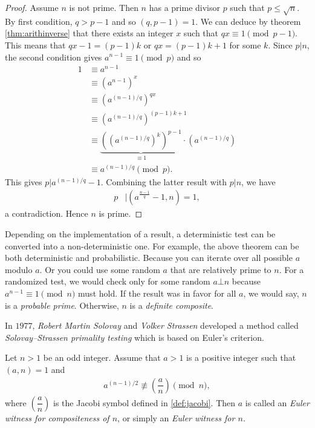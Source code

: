 \documentclass{subfiles}
\begin{document}
		\begin{proof}
			Assume $n$ is not prime. Then $n$ has a prime divisor $p$ such that $p \leq \sqrt n$. By first condition, $q>p-1$ and so $(q, p-1)=1$. We can deduce by theorem \autoref{thm:arithinverse} that there exists an integer $x$ such that $qx \equiv 1 \pmod {p-1}$. This means that $qx-1 = (p-1)k$ or $qx = (p-1)k+1$ for some $k$. Since $p|n$, the second condition gives $a^{n-1} \equiv 1 \pmod p$ and so
				\begin{align*}
					1 & \equiv a^{n-1} \\
					  & \equiv \left(a^{n-1}\right)^{x}\\
					  & \equiv \left(a^{(n-1)/q}\right)^{qx}\\
					  & \equiv \left(a^{(n-1)/q}\right)^{(p-1)k+1}\\
					  & \equiv \underbrace{\left(\left(a^{(n-1)/q}\right)^{k}\right)^{p-1}}_{\equiv 1} \cdot \left(a^{(n-1)/q}\right)\\
					  & \equiv a^{(n-1)/q} \pmod p.
				\end{align*}
			This gives $p|a^{(n-1)/q}-1$. Combining the latter result with $p|n$, we have
				\begin{align*}
					p & \mid \left(a^{\frac{n-1}{q}}-1,n\right)=1,
				\end{align*}
			a contradiction. Hence $n$ is prime.
		\end{proof}

		\begin{note}
			Depending on the implementation of a result, a deterministic test can be converted into a non-deterministic one. For example, the above theorem can be both deterministic and probabilistic. Because you can iterate over all possible $a$ modulo $a$. Or you could use some random $a$ that are relatively prime to $n$. For a randomized test, we would check only for some random $a\bot n$ because $a^{n-1}\equiv1\pmod n$ must hold. If the result was in favor for all $a$, we would say, $n$ is a \textit{probable prime}. Otherwise, $n$ is a \textit{definite composite}.
		\end{note}
	In $1977$, \textit{Robert Martin Solovay} and \textit{Volker Strassen} developed a method called \textit{Solovay--Strassen primality testing} which is based on Euler's criterion.

		\begin{definition}
			Let $n>1$ be an odd integer. Assume that $a>1$ is a positive integer such that $(a,n)=1$ and
				\begin{align*}
					a^{(n-1)/2} \not \equiv \left(\dfrac{a}{n}\right) \pmod n,
				\end{align*}
			where $\left(\dfrac{a}{n}\right)$ is the Jacobi symbol defined in \eqref{def:jacobi}. Then $a$ is called an \textit{Euler witness for compositeness of $n$}, or simply an \textit{Euler witness for $n$.}
		\end{definition}
\end{document}
